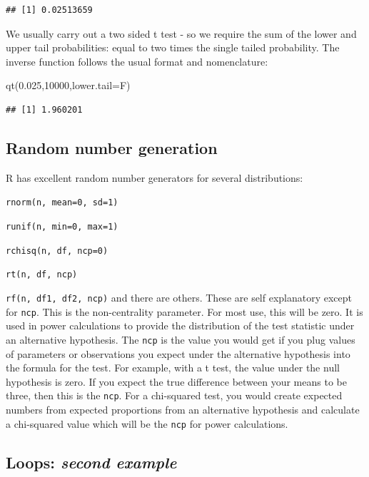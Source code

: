 \documentclass[
]{book}
\newenvironment{Shaded}{\begin{snugshade}}{\end{snugshade}}
\newcommand{\AttributeTok}[1]{\textcolor[rgb]{0.77,0.63,0.00}{#1}}
\newcommand{\DecValTok}[1]{\textcolor[rgb]{0.00,0.00,0.81}{#1}}
\newcommand{\FloatTok}[1]{\textcolor[rgb]{0.00,0.00,0.81}{#1}}
\newcommand{\FunctionTok}[1]{\textcolor[rgb]{0.00,0.00,0.00}{#1}}
\newcommand{\NormalTok}[1]{#1}
\begin{document}
\begin{verbatim}
## [1] 0.02513659
\end{verbatim}

We usually carry out a two sided t test - so we require the sum of the lower and upper tail probabilities: equal to two times the single tailed probability. The inverse function follows the usual format and nomenclature:

\begin{Shaded}
\begin{Highlighting}[]
\FunctionTok{qt}\NormalTok{(}\FloatTok{0.025}\NormalTok{,}\DecValTok{10000}\NormalTok{,}\AttributeTok{lower.tail=}\NormalTok{F)}
\end{Highlighting}
\end{Shaded}

\begin{verbatim}
## [1] 1.960201
\end{verbatim}

\hypertarget{random-number-generation}{%
\subsection{Random number generation}\label{random-number-generation}}

R has excellent random number generators for several distributions:

\texttt{rnorm(n,\ mean=0,\ sd=1)}

\texttt{runif(n,\ min=0,\ max=1)}

\texttt{rchisq(n,\ df,\ ncp=0)}

\texttt{rt(n,\ df,\ ncp)}

\texttt{rf(n,\ df1,\ df2,\ ncp)}
and there are others. These are self explanatory except for \texttt{ncp}. This is the non-centrality parameter. For most use, this will be zero. It is used in power calculations to provide the distribution of the test statistic under an alternative hypothesis. The \texttt{ncp} is the value you would get if you plug values of parameters or observations you expect under the alternative hypothesis into the formula for the test. For example, with a t test, the value under the null hypothesis is zero. If you expect the true difference between your means to be three, then this is the \texttt{ncp}. For a chi-squared test, you would create expected numbers from expected proportions from an alternative hypothesis and calculate a chi-squared value which will be the \texttt{ncp} for power calculations.

\hypertarget{loops-second-example}{%
\subsection{\texorpdfstring{Loops: \emph{second example}}{Loops: second example}}\label{loops-second-example}}
\end{document}
